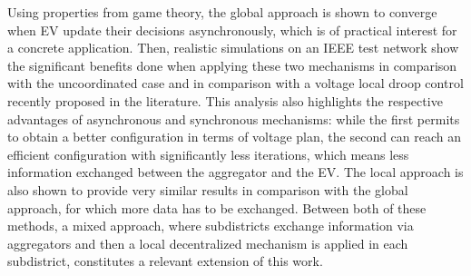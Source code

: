\documentclass[journal]{IEEEtran}
\begin{document}
Using properties from game theory, the global approach is shown to converge when EV update their decisions asynchronously, which is of practical interest for a concrete application. Then, realistic simulations on an IEEE test network show the significant benefits done when applying these two mechanisms in comparison with the uncoordinated case and in comparison with a voltage local droop control recently proposed in the literature. This analysis also highlights the respective advantages of asynchronous and synchronous mechanisms: while the first permits to obtain a better configuration in terms of voltage plan, the second can reach an efficient configuration with significantly less iterations, which means less information exchanged between the aggregator and the EV. The local approach is also shown to provide very similar results in comparison with the global approach, for which more data has to be exchanged. Between both of these methods, a mixed approach, where subdistricts exchange information via aggregators and then a local decentralized mechanism is applied in each subdistrict, constitutes a relevant extension of this work.
\ifCLASSOPTIONcaptionsoff
  \newpage
\fi



\end{document}
